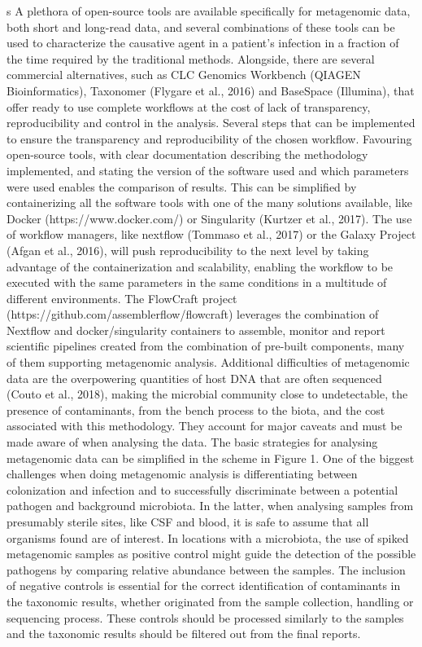 s
A plethora of open-source tools are available specifically for metagenomic data, both short and long-read data, and several combinations of these tools can be used to characterize the causative agent in a patient's infection in a fraction of the time required by the traditional methods. Alongside, there are several commercial alternatives, such as CLC Genomics Workbench (QIAGEN Bioinformatics), Taxonomer (Flygare et al., 2016) and BaseSpace (Illumina), that offer ready to use complete workflows at the cost of lack of transparency, reproducibility and control in the analysis.
Several steps that can be implemented to ensure the transparency and reproducibility of the chosen workflow. Favouring open-source tools, with clear documentation describing the methodology implemented, and stating the version of the software used and which parameters were used enables the comparison of results. This can be simplified by containerizing all the software tools with one of the many solutions available, like Docker (https://www.docker.com/) or Singularity (Kurtzer et al., 2017). The use of workflow managers, like nextflow (Tommaso et al., 2017) or the Galaxy Project (Afgan et al., 2016), will push reproducibility to the next level by taking advantage of the containerization and scalability, enabling the workflow to be executed with the same parameters in the same conditions in a multitude of different environments. The FlowCraft project (https://github.com/assemblerflow/flowcraft) leverages the combination of Nextflow and docker/singularity containers to assemble, monitor and report scientific pipelines created from the combination of pre-built components, many of them supporting metagenomic analysis.
Additional difficulties of metagenomic data are the overpowering quantities of host DNA that are often sequenced (Couto et al., 2018), making the microbial community close to undetectable, the presence of contaminants, from the bench process to the biota, and the cost associated with this methodology. They account for major caveats and must be made aware of when analysing the data.
The basic strategies for analysing metagenomic data can be simplified in the scheme in Figure 1. One of the biggest challenges when doing metagenomic analysis is differentiating between colonization and infection and to successfully discriminate between a potential pathogen and background microbiota. In the latter, when analysing samples from presumably sterile sites, like CSF and blood, it is safe to assume that all organisms found are of interest. In locations with a microbiota, the use of spiked metagenomic samples as positive control might guide the detection of the possible pathogens by comparing relative abundance between the samples. The inclusion of negative controls is essential for the correct identification of contaminants in the taxonomic results, whether originated from the sample collection, handling or sequencing process. These controls should be processed similarly to the samples and the taxonomic results should be filtered out from the final reports. 

